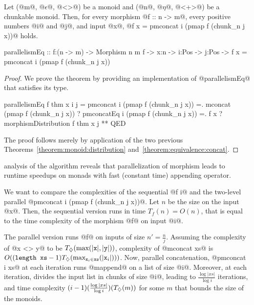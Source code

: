 %
\begin{theorem}\label{theorem:two-level}
Let (@m@, @$\epsilon$@, @<>@) be a monoid
and (@n@, @$\eta$@, @<+>@) be a chunkable monoid.
%
Then, for every morphism @f :: n -> m@,
every positive numbers @i@ and @j@, and input @x@,
@f x = pmconcat i (pmap f (chunk_n j x))@ holds.
%
\begin{code}
  parallelismEq
    :: f:(n -> m) -> Morphism n m f -> x:n -> i:Pos -> j:Pos
    -> {f x = pmconcat i (pmap f (chunk_n j x))}
\end{code}
\end{theorem}

\begin{proof}
We prove the theorem by providing an implementation of
@parallelismEq@ that satisfies its type.
%
\begin{code}
  parallelismEq f thm x i j
    =   pmconcat i (pmap f (chunk_n j x))
    =. mconcat (pmap f (chunk_n j x))
       ? pmconcatEq i (pmap f (chunk_n j x))
    =. f x
       ? morphismDistribution f thm x j
    ** QED
\end{code}
The proof follows merely by application of the 
two previous Theorems~\ref{theorem:monoid:distribution} and~\ref{theorem:equivalence:concat}.
\cqed\end{proof}


 analysis of the algorithm
reveals that parallelization of morphism  leads to runtime speedups
on monads with fast (constant time) appending operator.

We want to compare the complexities of the sequential @f i@
and the two-level parallel @pmconcat i (pmap f (chunk_n j x))@.
%
Let $n$ be the size on the input @x@.
Then, the sequential version runs in time
$T_f(n) = O(n)$, that is equal to the time complexity of the morphism @f@ on input @i@.
%

The parallel version runs @f@ on inputs of size $n' = \frac{n}{j}$.
%
Assuming the complexity of @x <> y@ to be $T_{\diamondsuit}(\text{max}(|\texttt{x}|, |\texttt{y}|))$,
complexity of @mconcat xs@ is $O((\texttt{length \ensuremath{\texttt{xs}}}-1) T_{\diamondsuit}(\text{max}_{\texttt{x}_i \in \texttt{xs}}(|\texttt{x}_i|)))$.
%
Now, parallel concatenation, @pmconcat i xs@ at each iteration runs @mappend@
on a list of size @i@. Moreover,
at each iteration, divides the input list in chunks of size @i@, leading to
$\frac{\log|xs|}{\log i}$ iterations, and time complexity
$(i-1)(\frac{\log|xs|}{\log i})(T_{\diamondsuit}(m))$
for some $m$ that bounds the size of the monoids.

